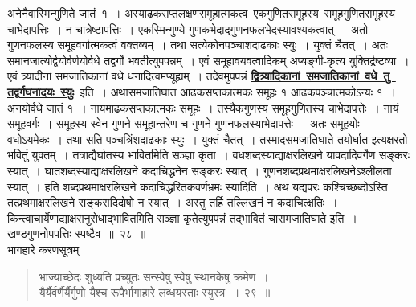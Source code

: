 \documentclass[11pt, openany]{book}
\begin{document}
अनेनैवास्मिन्गुणिते जातं \,१~।
अस्याढकसप्तलक्षणसमूहात्मकत्व \,एकगुणितसमूहस्य \,समूहगुणितसमूहस्य
चाभेदापत्तिः~। न
चात्रेष्टापत्तिः~। एकस्मिन्गुण्ये गुणकभेदाद्गुणनफलभेदस्यावश्यकत्वात्~।
अतो गुणनफलस्य समूहवर्गात्मकत्वं वक्तव्यम्~। तथा सत्येकोनपञ्चाशदाढकाः स्युः~। युक्तं चैतत्~। अतः
\newpage
\noindent समानजात्योर्द्वयोर्वर्णयोर्वधे तद्वर्गो भवतीत्युपपन्नम्~। एवं
समूहावयवत्वादिकम् अप्यङ्गी-कृत्य युक्तिर्द्रष्टव्या~। एवं त्र्यादीनां समजातिकानां वधे धनादित्वमप्यूह्यम्~। तदेवमुपपन्नं \hyperref[26]{\textbf{द्वित्र्यादिकानां \,समजातिकानां \,वधे \,तु \,तद्वर्गघनादयः \,स्युः}} \,इति~। अथासमजातिघात आढकसप्तकात्मकः समूहः १ आढकपञ्चात्मकोऽन्यः १~। अनयोर्वधे जातं १~। नायमाढकसप्तकात्मकः समूहः~। तस्यैकगुणस्य समूहगुणितस्य चाभेदापत्तेः~। नायं समूहवर्गः~। समूहस्य स्वेन गुणने समूहान्तरेण च गुणने गुणनफलस्याभेदापत्तेः~। अतः समूहयोः वधोऽयमेकः~।
तथा सति पञ्चत्रिंशदाढकाः स्युः~। युक्तं चैतत्~। तस्मादसमजातिघाते
तयोर्घात इत्यक्षरतो भवितुं युक्तम्~। तत्राद्यैर्घातस्य भावितमिति सञ्ज्ञा कृता~।
वधशब्दस्याद्याक्षरलिखने यावदादिवर्गेण सङ्करः स्यात्~। घातशब्दस्याद्याक्षरलिखने
कदाचिद्धनेन सङ्करः स्यात्~। गुणनशब्दप्रथमाक्षरलिखनेऽश्लीलता स्यात्~। हति
शब्दप्रथमाक्षरलिखने कदाचिद्धरितकवर्णभ्रमः स्यादिति~। अथ यद्यपरः कश्चिच्छब्दोऽस्ति
तत्प्रथमाक्षरलिखने सङ्करादिदोषो न स्यात्~। अस्तु तर्हि तल्लिखनं न कदाचित्क्षतिः~।
किन्त्वाचार्येणाद्याक्षरानुरोधाद्भावितमिति सञ्ज्ञा कृतेत्युपपन्नं तद्भावितं
चासमजातिघाते इति~। खण्डगुणनोपपत्तिः स्पष्टैव~॥~२८~॥\\

\vspace{-2mm}
{\bqt भागहारे करणसूत्रम्}

 \label{29}
\begin{quote}
    \ab
    भाज्याच्छेदः शुध्यति प्रच्युतः सन्स्वेषु स्वेषु स्थानकेषु क्रमेण~।\\
यैर्यैर्वर्णैर्यैर्गुणो यैश्च रूपैर्भागाहारे लब्धयस्ताः स्युरत्र~॥~२९~॥
\end{quote}
\end{document}
